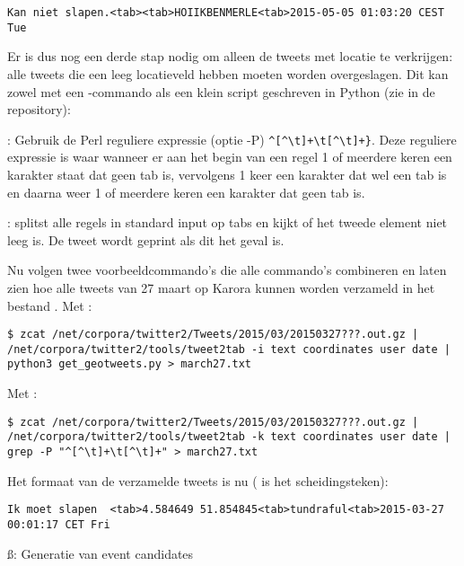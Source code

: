 {{\begin{lstlisting}
Kan niet slapen.<tab><tab>HOIIKBENMERLE<tab>2015-05-05 01:03:20 CEST Tue 
\end{lstlisting}

Er is dus nog een derde stap nodig om alleen de tweets met locatie te 
verkrijgen: alle tweets die een leeg locatieveld hebben moeten worden 
overgeslagen. Dit kan zowel met een -commando als een klein script 
geschreven in Python (zie  in de repository):

\begin{bullets}
\item {}: Gebruik de Perl reguliere expressie (optie -P) 
\verb|^[^\t]+\t[^\t]+}|. Deze reguliere expressie is waar wanneer er aan het 
begin van een regel 1 of meerdere keren een karakter staat dat geen tab is, 
vervolgens 1 keer een karakter dat wel een tab is en daarna weer 1 of meerdere 
keren een karakter dat geen tab is.
\item {}: splitst alle regels in standard input op tabs en 
kijkt of 
het tweede element niet leeg is. De tweet wordt geprint als dit het geval is.
\end{bullets}

Nu volgen twee voorbeeldcommando's die alle commando's combineren en laten zien 
hoe alle tweets van 27 maart op Karora kunnen worden verzameld in het bestand 
.
\vl
Met :
\begin{lstlisting}
$ zcat /net/corpora/twitter2/Tweets/2015/03/20150327???.out.gz | 
/net/corpora/twitter2/tools/tweet2tab -i text coordinates user date | 
python3 get_geotweets.py > march27.txt
\end{lstlisting}

Met :
\begin{lstlisting}
$ zcat /net/corpora/twitter2/Tweets/2015/03/20150327???.out.gz | 
/net/corpora/twitter2/tools/tweet2tab -k text coordinates user date | 
grep -P "^[^\t]+\t[^\t]+" > march27.txt
\end{lstlisting}

Het formaat van de verzamelde tweets is nu ( is het scheidingsteken):
\begin{lstlisting}
Ik moet slapen	<tab>4.584649 51.854845<tab>tundraful<tab>2015-03-27 00:01:17 CET Fri 
\end{lstlisting}
\vspace*{-10pt}

\ss{: Generatie van event candidates}\label{EventCandidates}

}}
